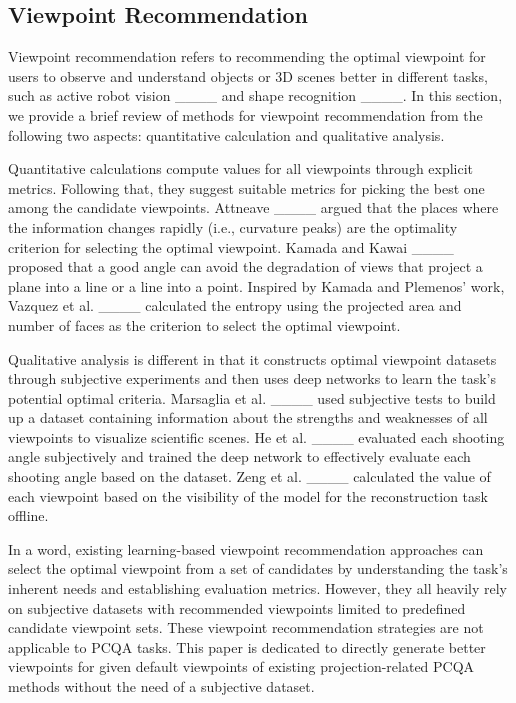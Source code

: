 \subsection{Viewpoint Recommendation}

Viewpoint recommendation refers to recommending the optimal viewpoint for users to observe and understand objects or 3D scenes better in different tasks, such as active robot vision ____ and shape recognition ____. 
In this section, we provide a brief review of methods for viewpoint recommendation from the following two aspects: quantitative calculation and qualitative analysis.

Quantitative calculations compute values for all viewpoints through explicit metrics.
Following that, they suggest suitable metrics for picking the best one among the candidate viewpoints.
Attneave ____ argued that the places where the information changes rapidly (i.e., curvature peaks) are the optimality criterion for selecting the optimal viewpoint.
Kamada and Kawai ____ proposed that a good angle can avoid the degradation of views that project a plane into a line or a line into a point.
Inspired by Kamada and Plemenos' work, Vazquez et al. ____ calculated the entropy using the projected area and number of faces as the criterion to select the optimal viewpoint.

Qualitative analysis is different in that it constructs optimal viewpoint datasets through subjective experiments and then uses deep networks to learn the task's potential optimal criteria.
Marsaglia et al. ____ used subjective tests to build up a dataset containing information about the strengths and weaknesses of all viewpoints to visualize scientific scenes.
He et al. ____ evaluated each shooting angle subjectively and trained the deep network to effectively evaluate each shooting angle based on the dataset.
Zeng et al. ____ calculated the value of each viewpoint based on the visibility of the model for the reconstruction task offline.
                 
In a word, existing learning-based viewpoint recommendation approaches can select the optimal viewpoint from a set of candidates by understanding the task's inherent needs and establishing evaluation metrics.
However, they all heavily rely on subjective datasets with recommended viewpoints limited to predefined candidate viewpoint sets. These viewpoint recommendation strategies are not applicable to PCQA tasks.
This paper is dedicated to directly generate better viewpoints for given default viewpoints of existing projection-related PCQA methods without the need of a subjective dataset.